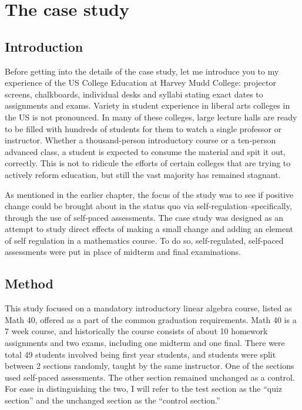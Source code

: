 \chapter{The case study}
\section{Introduction}

Before getting into the details of the case study, let me introduce you to my experience of the US College Education at Harvey Mudd College: projector screens, chalkboards, individual desks and syllabi stating exact dates to assignments and exams. Variety in student experience in liberal arts colleges in the US is not pronounced. In many of these colleges, large lecture halls are ready to be filled with hundreds of students for them to watch a single professor or instructor. Whether a thousand-person introductory course or a ten-person advanced class, a student is expected to consume the material and spit it out, correctly. This is not to ridicule the efforts of certain colleges that are trying to actively reform education, but still the vast majority has remained stagnant.

As mentioned in the earlier chapter, the focus of the study was to see if positive change could be brought about in the status quo via self-regulation--specifically, through the use of self-paced assessments. The case study was designed as an attempt to study direct effects of making a small change and adding an element of self regulation in a mathematics course. To do so, self-regulated, self-paced assessments were put in place of midterm and final examinations.

\section{Method}
This study focused on a mandatory introductory linear algebra course, listed as Math 40, offered as a part of the common graduation requirements. Math 40 is a 7 week course, and historically the course consists of about 10 homework assignments and two exams, including one midterm and one final. There were total 49 students involved being first year students, and students were split between 2 sections randomly, taught by the same instructor. One of the sections used self-paced assessments. The other section remained unchanged as a control. For ease in distinguishing the two, I will refer to the test section as the ``quiz section'' and the unchanged section as the ``control section.''

